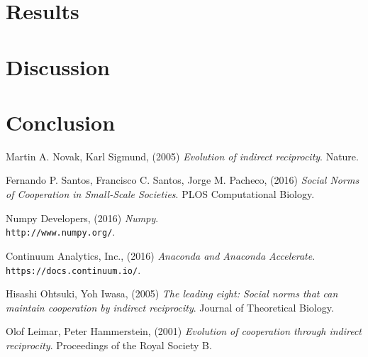 \documentclass[10pt,a4paper]{article}
\begin{document}
\section{Results}

\section{Discussion}

\section{Conclusion}

\pagebreak
\begin{thebibliography}{9}

Martin A. Novak, Karl Sigmund, (2005) 
\textit{Evolution of indirect reciprocity}. 
Nature.

Fernando P. Santos, Francisco C. Santos, Jorge M. Pacheco, (2016) 
\textit{Social Norms of Cooperation in Small-Scale Societies}. 
PLOS Computational Biology.

Numpy Developers, (2016) 
\textit{Numpy}. 
\\\texttt{http://www.numpy.org/}.

Continuum Analytics, Inc., (2016) 
\textit{Anaconda and Anaconda Accelerate}. 
\\\texttt{https://docs.continuum.io/}.

Hisashi Ohtsuki, Yoh Iwasa, (2005) 
\textit{The leading eight: Social norms that can maintain cooperation by indirect reciprocity}. 
Journal of Theoretical Biology.

Olof Leimar, Peter Hammerstein, (2001) 
\textit{Evolution of cooperation through indirect reciprocity}. 
Proceedings of the Royal Society B.

\end{thebibliography}
\end{document}
